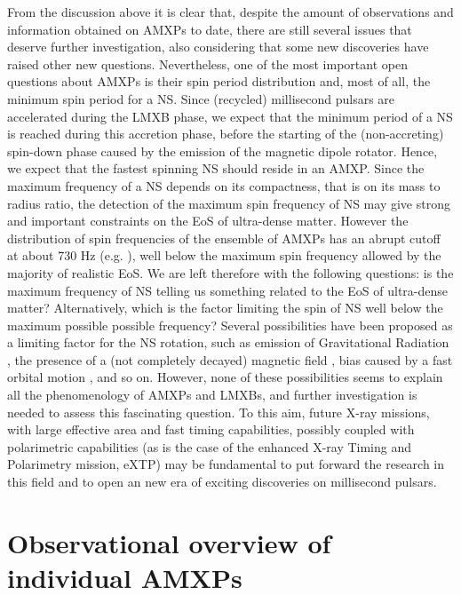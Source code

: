 \documentclass[graybox]{svmult}
\begin{document}
From the discussion above it is clear that, despite the amount of observations and information obtained on AMXPs to date, there are still several issues that deserve further investigation, also considering that some new discoveries have raised other new questions. Nevertheless, one of the most important open questions about AMXPs is their spin period distribution and, most of all, the minimum spin period for a NS. Since (recycled) millisecond pulsars are accelerated during the LMXB phase, we expect that the minimum period of a NS is reached during this accretion phase, before the starting of the (non-accreting) spin-down phase caused by the emission of the magnetic dipole rotator. Hence, we expect that the fastest spinning NS should reside in an AMXP. Since the maximum frequency of a NS depends on its compactness, that is on its mass to radius ratio, the detection of the maximum spin frequency of NS may give strong and important constraints on the EoS of ultra-dense matter.
However the distribution of spin frequencies of the ensemble of AMXPs has an abrupt cutoff at about 730 Hz (e.g. \cite{Patruno2017b}), well below the maximum spin frequency allowed by the majority of realistic EoS. We are left therefore with the following questions: is the maximum frequency of NS telling us something related to the EoS of ultra-dense matter? Alternatively, which is the factor limiting the spin of NS well below the maximum possible possible frequency? Several possibilities have been proposed as a limiting factor for the NS rotation, such as emission of Gravitational Radiation \cite{Hartman2011,Papitto2011b}, the presence of a (not completely decayed) magnetic field \cite{ Patruno2012}, bias caused by a fast orbital motion \cite{Burderi2001}, and so on. However, none of these possibilities seems to explain all the phenomenology of AMXPs and LMXBs, and further investigation is needed to assess this fascinating question. To this aim, future X-ray missions, with large effective area and fast timing capabilities, possibly coupled with polarimetric capabilities (as is the case of the enhanced X-ray Timing and Polarimetry mission, eXTP) may be fundamental to put forward the research in this field and to open an new era of exciting discoveries on millisecond pulsars.    




\section{Observational overview of individual AMXPs}
\end{document}
